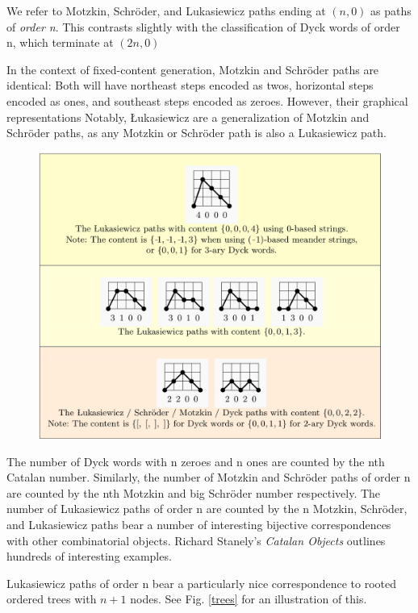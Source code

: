 We refer to Motzkin, Schröder, and Lukasiewicz paths ending at $(n,0)$ as paths of \emph{order n}.  This contrasts slightly with the classification of Dyck words of order n, which terminate at $(2n,0)$

In the context of fixed-content generation, Motzkin and Schröder paths are identical:  Both will have northeast steps encoded as twos, horizontal steps encoded as ones, and southeast steps encoded as zeroes.  However, their graphical representations Notably, Łukasiewicz are a generalization of Motzkin and Schröder paths, as any Motzkin or Schröder path is also a Lukasiewicz path.

\bigskip

\begin{figure}[]
	\centering
	\includegraphics[width = .95 \textwidth]{paths.png}
	\caption{}
	\label{paths}
\end{figure}


The number of Dyck words with n zeroes and n ones are counted by the nth Catalan number.  Similarly, the number of Motzkin and Schröder paths of order n are counted by the nth Motzkin and big Schröder number respectively. The number of Lukasiewicz paths of order n are counted by the n
Motzkin, Schröder, and Lukasiewicz paths bear a number of interesting bijective correspondences with other combinatorial objects. Richard Stanely's \emph{Catalan Objects} outlines hundreds of interesting examples.  

Lukasiewicz paths  of order n bear a particularly nice correspondence to rooted ordered trees with $n+1$ nodes. See Fig. \ref{trees} for an illustration of this.

